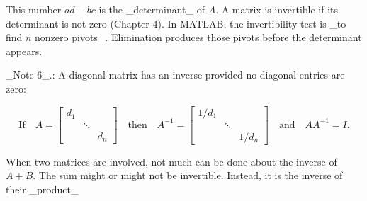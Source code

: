 This number \(ad-bc\) is the _determinant_ of \(A\). A matrix is invertible if its determinant is not zero (Chapter 4). In MATLAB, the invertibility test is _to find \(n\) nonzero pivots_. Elimination produces those pivots before the determinant appears.

_Note 6_.: A diagonal matrix has an inverse provided no diagonal entries are zero:

\[\text{If}\quad A=\begin{bmatrix}d_{1}&&\\ &\ddots&\\ &&d_{n}\end{bmatrix}\quad\text{then}\quad A^{-1}=\begin{bmatrix}1/d_{1}&&\\ &\ddots&\\ &&1/d_{n}\end{bmatrix}\quad\text{and}\quad AA^{-1}=I.\]

When two matrices are involved, not much can be done about the inverse of \(A+B\). The sum might or might not be invertible. Instead, it is the inverse of their _product_ 